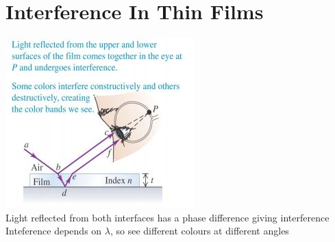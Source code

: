\documentclass[a4paper, 11pt, fleqn, normalem]{report}
\begin{document}
\section{Interference In Thin Films}
\includegraphics{Film.jpg} \\
Light reflected from both interfaces has a phase difference giving interference \\
Inteference depends on $\lambda$, so see different colours at different angles
\end{document}
